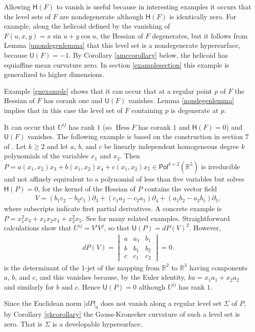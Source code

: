 \documentclass [leqno, 10pt]{amsart}
\theoremstyle{definition}
\numberwithin{equation}{section}
\newcommand{\U}{\mathsf{U}}
\renewcommand{\H}{\mathsf{H}}
\newcommand{\pol}{\mathsf{Pol}}
\newcommand{\hess}{\operatorname{Hess}}
\newcommand{\pr}{\partial}
\newcommand{\rea}{\mathbb R}
\begin{document}
\begin{example}
Allowing $\H(F)$ to vanish is useful because in interesting examples it occurs that the level sets of $F$ are nondegenerate although $\H(F)$ is identically zero. For example, along the helicoid defined by the vanishing of $F(u, x, y) = x\sin u + y\cos u$, the Hessian of $F$ degenerates, but it follows from Lemma \ref{unondegenlemma} that this level set is a nondegenerate hypersurface, because $\U(F) = -1$. By Corollary \ref{amccorollary} below, the helicoid has equiaffine mean curvature zero. In section \ref{examplesection} this example is generalized to higher dimensions.
\end{example}

Example \ref{gnexample} shows that it can occur that at a regular point $p$ of $F$ the Hessian of $F$ has corank one and $\U(F)$ vanishes. Lemma \ref{nondegenlemma} implies that in this case the level set of $F$ containing $p$ is degenerate at $p$.

\begin{example}\label{gnexample}
It can occur that $U^{ij}$ has rank $1$ (so $\hess F$ has corank $1$ and $\H(F) = 0$) and $\U(F)$ vanishes. The following example is based on the construction in section $7$ of \cite{Gordan-Noether}. 
Let $k \geq 2$ and let $a$, $b$, and $c$ be linearly independent homogeneous degree $k$ polynomials of the variables $x_{1}$ and $x_{2}$. Then $P = a(x_{1}, x_{2})x_{3} + b(x_{1}, x_{2})x_{4} + c(x_{1}, x_{2})x_{5} \in \pol^{k+2}(\rea^{5})$ is irreducible and not affinely equivalent to a polynomial of less than five variables but solves $\H(P) = 0$, for the kernel of the Hessian of $P$ contains the vector field 
\begin{align}\label{vgn}
V = (b_{1}c_{2} - b_{2}c_{1})\pr_{3} + (c_{1}a_{2} - c_{2}a_{1})\pr_{4} + (a_{1}b_{2} - a_{2}b_{1})\pr_{5}, 
\end{align}
where subscripts indicate first partial derivatives. A concrete example is $P = x_{1}^{2}x_{3} + x_{1}x_{2}x_{4} + x_{2}^{2}x_{5}$. See \cite{Ciliberto-Russo-Simis} for many related examples. Straightforward calculations show that $U^{ij} = V^{i}V^{j}$, so that $\U(P) = dP(V)^{2}$. However, 
\begin{align}\label{dpv}
dP(V) = \begin{vmatrix} a & a_{1} & b_{1} \\ b & b_{1} & b_{2} \\ c & c_{1} & c_{2} \end{vmatrix} = 0.
\end{align}
is the determinant of the $1$-jet of the mapping from $\rea^{2}$ to $\rea^{3}$ having components $a$, $b$, and $c$, and this vanishes because, by the Euler identity, $ka = x_{1}a_{1} + x_{2}a_{2}$ and similarly for $b$ and $c$.
Hence $\U(P) = 0$ although $U^{ij}$ has rank $1$. 

Since the Euclidean norm $|dP|_{\delta}$ does not vanish along a regular level set $\Sigma$ of $P$, by Corollary \ref{gkcorollary} the Gauss-Kronecker curvature of such a level set is zero. That is $\Sigma$ is a developable hypersurface.
\end{example}
\end{document}
